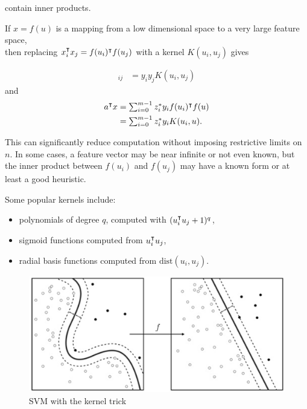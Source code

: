 \documentclass{article}
\begin{document}
    contain inner products. 
    
    If $x=f(u)$ is a mapping from a low dimensional space to a very large feature space,\\
    then replacing $x_i^\intercal x_j = f(u_i)^\intercal f(u_j)$ with a kernel $K(u_i,u_j)$ gives \cite[p.~321]{ml}

    \begin{align*}
        [Q_{\text{dual}\:}]_{ij}
        &=y_i y_j K(u_i,u_j)
    \end{align*}
    and
    \begin{align*}
        a^\intercal x &= \textstyle\sum_{i=0}^{m-1} z_i^*y_if(u_i)^\intercal f(u)\\
        &= \textstyle\sum_{i=0}^{m-1} z_i^*y_i K(u_i,u).
    \end{align*}

    This can significantly reduce computation without imposing restrictive limits on $n$.
    In some cases, a feature vector may be near infinite or not even known, but the inner product between
    $f(u_i)$ and $f(u_j)$ may have a known form or at least a good heuristic.

    Some popular kernels include:
    \begin{itemize}
        \item polynomials of degree $q$, computed with $(u_i^\intercal u_j+1)^q$,
        \item sigmoid functions computed from $u_i^\intercal u_j$,
        \item radial basis functions computed from $\text{dist}(u_i,u_j)$.
    \end{itemize}

    \clearpage

    \begin{figure}[h!]
        \centering
        \includegraphics[width=1\textwidth]{./figs/svm/svm_kernel.jpg}
        \caption{SVM with the kernel trick}
        \label{fig:svm_kernel}
    \end{figure}
\end{document}
